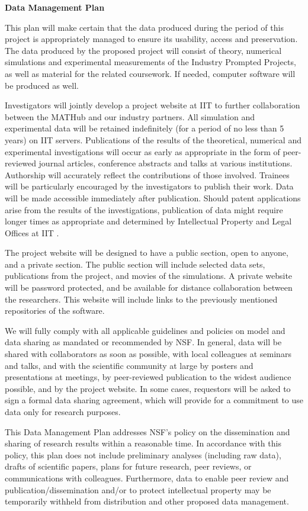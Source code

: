 \documentclass[11pt]{NSFamsart}
\begin{document}

\centerline{\textbf{\Large Data Management Plan}}

\bigskip



This plan will make certain that the data produced during the period of this project is appropriately managed to ensure its usability, access and preservation.  The data produced by the proposed project will consist of theory, numerical simulations and experimental measurements of the Industry Prompted Projects, as well as material for the related coursework.  If needed, computer software will be produced as well. 

Investigators will jointly develop a project website at IIT to further collaboration between the MATHub and our industry partners.  All simulation and experimental data will be retained indefinitely (for a period of no less than 5 years) on IIT servers.  Publications of the results of the theoretical, numerical and experimental investigations will occur as early as appropriate in the form of peer-reviewed journal articles, conference abstracts and talks at various institutions. Authorship will accurately reflect the contributions of those involved.  Trainees will be particularly encouraged by the investigators to publish their work.  Data will be made accessible immediately after publication.  Should patent applications arise from the results of the investigations, publication of data might require longer times as appropriate and determined by Intellectual Property and Legal Offices at IIT . 

The project website will be designed to have a public section, open to anyone, and a private section.  The public section will include selected data sets, publications from the project, and movies of the simulations.  A private website will be password protected, and be available for distance collaboration between the researchers. This website will include links to the previously mentioned repositories of the software. 

We will fully comply with all applicable guidelines and policies on model and data sharing as mandated or recommended by NSF.  In general, data will be shared with collaborators as soon as possible, with local colleagues at seminars and talks, and with the scientific community at large by posters and presentations at meetings, by peer-reviewed publication to the widest audience possible, and by the project website.  In some cases, requestors will be asked to sign a formal data sharing agreement, which will provide for a commitment to use data only for research purposes. 

This Data Management Plan addresses NSF’s policy on the dissemination and sharing of research results within a reasonable time.  In accordance with this policy, this plan does not include preliminary analyses (including raw data), drafts of scientific papers, plans for future research, peer reviews, or communications with colleagues.  Furthermore, data to enable peer review and publication/dissemination and/or to protect intellectual property may be temporarily withheld from distribution and other proposed data management. 
\end{document}
